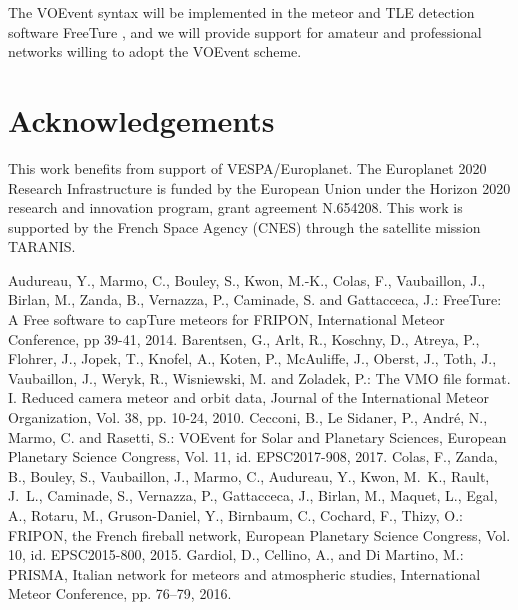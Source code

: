\documentclass[10pt,twocolumn]{article}
\begin{document}
The VOEvent syntax will be implemented in the meteor and TLE detection software FreeTure \cite{freeture}, 
and we will provide support for amateur and professional networks willing to adopt the VOEvent scheme.
\newpage
\section*{Acknowledgements}
This work benefits from support of VESPA/Europlanet.
The Europlanet 2020 Research Infrastructure is funded by the European Union
under the Horizon 2020 research and innovation program, grant agreement N.654208.
This work is supported by the French Space Agency (CNES) through the satellite mission
TARANIS.
\begin{thebibliography}{}
\small
{}
Audureau, Y., Marmo, C., Bouley, S., Kwon, M.-K., Colas, F., Vaubaillon, J., Birlan, M., Zanda, B., Vernazza, P., Caminade, S. and Gattacceca, J.: FreeTure: A Free software to capTure meteors for FRIPON, International Meteor Conference, pp 39-41, 2014.
Barentsen, G., Arlt, R., Koschny, D., Atreya, P., Flohrer, J., Jopek, T., Knofel, A., Koten, P., McAuliffe, J., Oberst, J., Toth, J., Vaubaillon, J., Weryk, R., Wisniewski, M. and Zoladek, P.: The VMO file format. I. Reduced camera meteor and orbit data, Journal of the International Meteor Organization, Vol. 38, pp. 10-24, 2010.
Cecconi, B., Le Sidaner, P., Andr\'e, N., Marmo, C. and Rasetti, S.: VOEvent for Solar and Planetary Sciences, European Planetary Science Congress, Vol. 11, id. EPSC2017-908, 2017.
Colas, F., Zanda, B., Bouley, S., Vaubaillon, J., Marmo, C., Audureau, Y., Kwon, M.~K., Rault, J.~L., Caminade, S., Vernazza, P., Gattacceca, J., Birlan, M., Maquet, L., Egal, A., Rotaru, M., Gruson-Daniel, Y., Birnbaum, C., Cochard, F., Thizy, O.: FRIPON, the French fireball network, European Planetary Science Congress, Vol. 10, id. EPSC2015-800, 2015.
Gardiol, D., Cellino, A., and Di Martino, M.: PRISMA, Italian network for meteors and atmospheric studies, International Meteor Conference, pp. 76–79, 2016.

\end{thebibliography}
\end{document}
